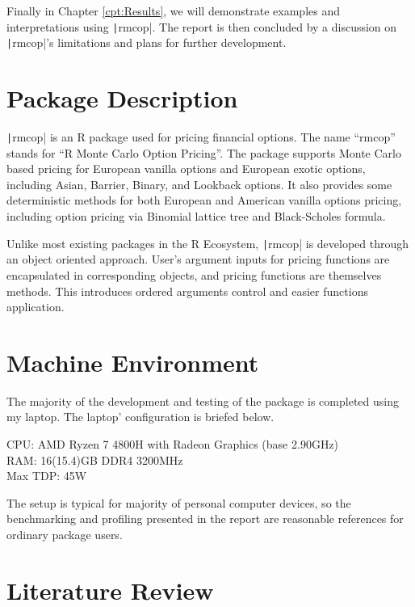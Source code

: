 Finally in Chapter \ref{cpt:Results}, we will demonstrate examples and interpretations using \texttt|rmcop|. The report is then concluded by a discussion on \texttt|rmcop|'s limitations and plans for further development.

\section{Package Description} \label{sec:Pkg Description}

\texttt|rmcop| is an R package used for pricing financial options. The name ``rmcop'' stands for ``R Monte Carlo Option Pricing''. The package supports Monte Carlo based pricing for European vanilla options and European exotic options, including Asian, Barrier, Binary, and Lookback options. It also provides some deterministic methods for both European and American vanilla options pricing, including option pricing via Binomial lattice tree and Black-Scholes formula.

Unlike most existing packages in the R Ecosystem, \texttt|rmcop| is developed through an object oriented approach. User's argument inputs for pricing functions are encapsulated in corresponding objects, and pricing functions are themselves methods. This introduces ordered arguments control and easier functions application.

\section{Machine Environment} \label{sec:machine_env}

The majority of the development and testing of the package is completed using my laptop. The laptop' configuration is briefed below.

\begin{listing}[H]
CPU: AMD Ryzen 7 4800H with Radeon Graphics (base 2.90GHz) \\
RAM: 16(15.4)GB DDR4 3200MHz \\
Max TDP: 45W
\end{listing}

The setup is typical for majority of personal computer devices, so the benchmarking and profiling presented in the report are reasonable references for ordinary package users.

\section{Literature Review} \label{sec:Literature Review}

